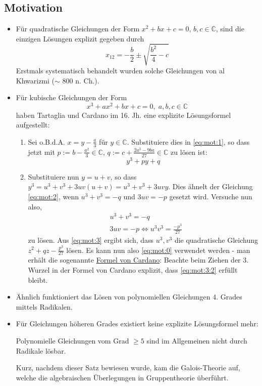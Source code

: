 \documentclass[../main.tex]{subfiles}
\begin{document}
\subsection{Motivation}\label{sec:mot}
\begin{itemize}
    \item Für quadratische Gleichungen der Form $x^2 + bx + c = 0$, $b, c \in \mathbb{C}$, sind die einzigen Lösungen explizit gegeben durch 
    \begin{equation}\label{eq:mot:0}
        x_{12} = -\frac{b}{2} \pm \sqrt{\frac{b^2}{4} - c}
    \end{equation} 
    Erstmals systematisch behandelt wurden solche Gleichungen von al Khwarizmi ($\sim$ 800 n. Ch.).
    \item Für kubische Gleichungen der Form
    \begin{equation}\label{eq:mot:1}
        x^3 + ax^2 + bx + c = 0, \; a, b, c \in \mathbb{C}
    \end{equation}
    haben Tartaglia und Cardano im 16. Jh. eine explizite Lösungsformel aufgestellt:
    \begin{enumerate}
        \item Sei o.B.d.A. $x = y - \frac{a}{3}$ für $y \in \mathbb{C}$. Substituiere dies in \cref{eq:mot:1}, so dass jetzt mit $p := b - \frac{a^2}{3} \in \mathbb{C}$, $q := c + \frac{2a^3 - 9ba}{27} \in \mathbb{C}$ zu lösen ist:
        \begin{equation}\label{eq:mot:2}
            y^3 + py + q
        \end{equation}
        \item Substituiere nun $y = u + v$, so dass $y^3 = u^3 + v^3 + 3uv(u+v) = u^3 + v^3 + 3uv y$.
        Dies ähnelt der Gleichung \cref{eq:mot:2}, wenn $u^3 + v^3 = -q$ und $3uv = -p$ gesetzt wird. Versuche nun also, 
            \begin{align}\label{eq:mot:3}
                &u^3 + v^3 = -q \\
                &3uv = -p \Leftrightarrow u^3v^3 = \frac{-p^3}{27}\label{eq:mot:3:2}
            \end{align}
        zu lösen.
        Aus \cref{eq:mot:3} ergibt sich, dass $u^3, v^3$ die quadratische Gleichung $z^2 + qz - \frac{p^3}{27}$ lösen. Es kann nun also \cref{eq:mot:0} verwendet werden - man erhält die sogenannte \href{https://de.wikipedia.org/wiki/Cardanische_Formeln}{Formel von Cardano}:
        Beachte beim Ziehen der 3. Wurzel in der Formel von Cardano explizit, dass \cref{eq:mot:3:2} erfüllt bleibt.
    \end{enumerate}
    \item Ähnlich funktioniert das Lösen von polynomiellen Gleichungen 4. Grades mittels Radikalen.
    \item Für Gleichungen höheren Grades existiert keine explizite Lösungsformel mehr: 
    \begin{theorem}
        Polynomielle Gleichungen vom Grad $\geq 5$ sind im Allgemeinen nicht durch Radikale lösbar.
    \end{theorem}
    Kurz, nachdem dieser Satz bewiesen wurde, kam die Galois-Theorie auf, welche die algebraischen Überlegungen in Gruppentheorie überführt.
\end{itemize}
\end{document}

